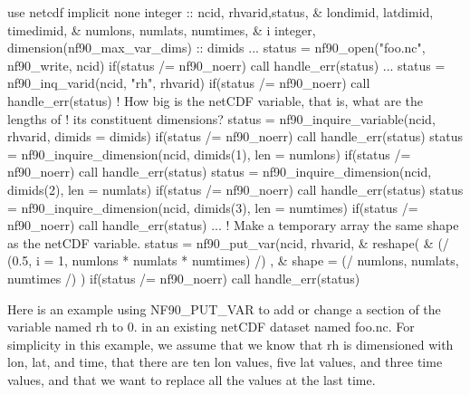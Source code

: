 \begin{DoxyCode}
\textcolor{keywordtype}{use }netcdf
\textcolor{keywordtype}{implicit none}
\textcolor{keywordtype}{integer}                               :: ncid, rhvarid,status,          &
                                         londimid, latdimid, timedimid, &
                                         numlons, numlats, numtimes,    &
                                         i
\textcolor{keywordtype}{integer}, \textcolor{keywordtype}{dimension(nf90\_max\_var\_dims)} :: dimids
...
status = nf90\_open(\textcolor{stringliteral}{"foo.nc"}, nf90\_write, ncid)
\textcolor{keywordflow}{if}(status /= nf90\_noerr) \textcolor{keyword}{call }handle\_err(status)
...
status = nf90\_inq\_varid(ncid, \textcolor{stringliteral}{"rh"}, rhvarid)
\textcolor{keywordflow}{if}(status /= nf90\_noerr) \textcolor{keyword}{call }handle\_err(status)
\textcolor{comment}{! How big is the netCDF variable, that is, what are the lengths of}
\textcolor{comment}{!   its constituent dimensions?}
status = nf90\_inquire\_variable(ncid, rhvarid, dimids = dimids)
\textcolor{keywordflow}{if}(status /= nf90\_noerr) \textcolor{keyword}{call }handle\_err(status)
status = nf90\_inquire\_dimension(ncid, dimids(1), len = numlons)
\textcolor{keywordflow}{if}(status /= nf90\_noerr) \textcolor{keyword}{call }handle\_err(status)
status = nf90\_inquire\_dimension(ncid, dimids(2), len = numlats)
\textcolor{keywordflow}{if}(status /= nf90\_noerr) \textcolor{keyword}{call }handle\_err(status)
status = nf90\_inquire\_dimension(ncid, dimids(3), len = numtimes)
\textcolor{keywordflow}{if}(status /= nf90\_noerr) \textcolor{keyword}{call }handle\_err(status)
...
\textcolor{comment}{! Make a temporary array the same shape as the netCDF variable.}
status = nf90\_put\_var(ncid, rhvarid, &
                      reshape( &
                        (/ (0.5, i = 1, numlons * numlats * numtimes) /) , &
                       shape = (/ numlons, numlats, numtimes /) )
\textcolor{keywordflow}{if}(status /= nf90\_noerr) \textcolor{keyword}{call }handle\_err(status)
\end{DoxyCode}


Here is an example using N\+F90\+\_\+\+P\+U\+T\+\_\+\+V\+AR to add or change a section of the variable named rh to 0. in an existing net\+C\+DF dataset named foo.\+nc. For simplicity in this example, we assume that we know that rh is dimensioned with lon, lat, and time, that there are ten lon values, five lat values, and three time values, and that we want to replace all the values at the last time.


